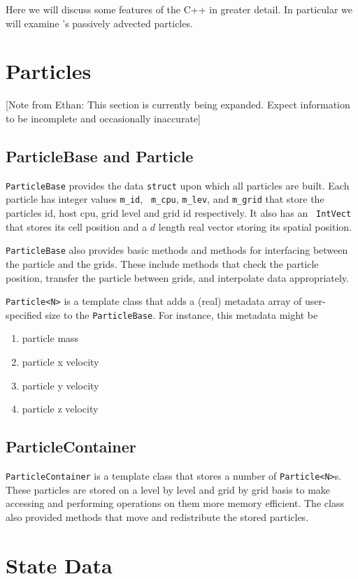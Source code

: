 Here we will discuss some features of the C++ in greater detail. In 
particular we will examine \BoxLib's passively advected particles.

\section{Particles}\label{Sec:Particles}
[Note from Ethan: This section is currently being expanded. Expect information to be 
incomplete and occasionally inaccurate]

\subsection{ParticleBase and Particle}
{\tt ParticleBase} provides the data {\tt struct} upon which all 
particles are built. Each particle has integer values {\tt m\_id}, {\tt 
m\_cpu}, {\tt m\_lev}, and {\tt m\_grid} that store the particles id, 
host cpu, grid level and grid id respectively. It also has an {\tt 
IntVect} that stores its cell position and a $d$ length real vector 
storing its spatial position.

{\tt ParticleBase} also provides basic methods and methods for interfacing between 
the particle and the grids. These include methods that check the 
particle position, transfer the particle between grids, and 
interpolate data appropriately.

{\tt Particle<N>} is a template class that adds a (real) metadata array of 
user-specified size to the {\tt ParticleBase}. For instance, this 
metadata might be 
\begin{enumerate}
   \item particle mass
   \item particle x velocity
   \item particle y velocity
   \item particle z velocity
\end{enumerate}
\subsection{ParticleContainer}
{\tt ParticleContainer} is a template class that stores a number of 
{\tt Particle<N>}s. These particles are stored on a level by level and 
grid by grid basis to make accessing and performing operations on them 
more memory efficient. The class also provided methods that move and 
redistribute the stored particles.
\section{State Data}
